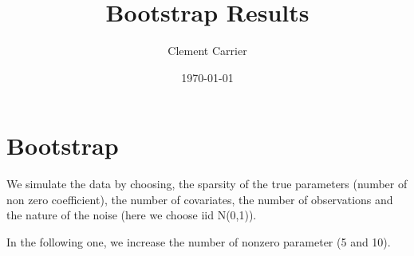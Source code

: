 \documentclass[11pt,oneside, a4paper]{amsart}\usepackage[]{graphicx}\usepackage[]{color}
\begin{document}
  
\title{Bootstrap Results}   
\author{Clement Carrier}
\date{\today}
\maketitle


\section*{Bootstrap}










We simulate the data by choosing, the sparsity of the true parameters (number of non zero coefficient), the number of covariates, the number of observations and the nature of the noise (here we choose iid N(0,1)). 







\begin{table}[ht]
\centering
\caption{Simulation Result} 
\label{Test_table}
{\footnotesize
{}
}
\end{table}





In the following one, we increase the number of nonzero parameter (5 and 10). 
\end{document}
